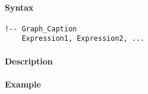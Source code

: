 


	\paragraph{Syntax}

\begin{verbatim}
!-- Graph_Caption
    Expression1, Expression2, ...
\end{verbatim}

\paragraph{Description}

\paragraph{Example}


